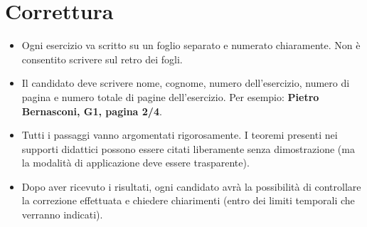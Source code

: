 \documentclass[12pt,a4paper]{article}
\begin{document}
\section{Correttura}
\begin{itemize}
\item Ogni esercizio va scritto su un foglio separato e numerato chiaramente. Non \`e consentito scrivere sul retro dei fogli.
\item Il candidato deve scrivere nome, cognome, numero dell'esercizio, numero di pagina e numero totale di pagine dell'esercizio. Per esempio: \textbf{Pietro Bernasconi, G1, pagina 2/4}.
\item Tutti i passaggi vanno argomentati rigorosamente. I teoremi presenti nei supporti didattici possono essere citati liberamente senza dimostrazione (ma la modalit\`a di applicazione deve essere trasparente). 
\item Dopo aver ricevuto i risultati, ogni candidato avr\`a la possibilit\`a di controllare la correzione effettuata e chiedere chiarimenti (entro dei limiti temporali che verranno indicati).
\end{itemize}
\end{document}
